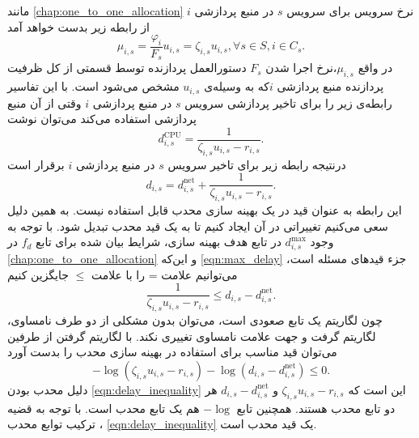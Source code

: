     مانند \cref{chap:one_to_one_allocation} نرخ سرویس برای سرویس $s$ در منبع پردازشی $i$ از رابطه زیر بدست خواهد آمد
    \begin{equation}
      \mu_{i,s} = \frac{\varphi_i}{F_s} u_{i,s} = \zeta_{i,s} u_{i,s}, \forall s \in S, i \in C_s.
    \end{equation}
    در واقع $\mu_{i,s}$،نرخ اجرا شدن $F_s$ دستورالعمل پردازنده توسط قسمتی از کل ظرفیت پردازنده منبع پردازشی $i$که به وسیله‌ی $u_{i,s}$ مشخص می‌شود است.
    با این تفاسیر رابطه‌ی زیر را برای تاخیر پردازشی سرویس $s$ در منبع پردازشی $i$ وقتی از آن منبع پردازشی استفاده می‌کند می‌توان نوشت
    \begin{equation}
      d_{i,s}^\text{CPU} = \frac{1}{\zeta_{i,s} u_{i,s} - r_{i,s}}.
    \end{equation}
    درنتیجه رابطه زیر برای تاخیر سرویس $s$ در منبع پردازشی $i$ برقرار است
    \begin{equation}
      d_{i,s} = d_{i,s}^\text{net} + \frac{1}{\zeta_{i,s} u_{i,s} - r_{i,s}}.
    \end{equation}
    این رابطه به عنوان قید در یک بهینه سازی محدب قابل استفاده نیست.
    به همین دلیل سعی می‌کنیم تغییراتی در آن ایجاد کنیم تا به یک قید محدب تبدیل شود.
    با توجه به وجود $d_{i,s}^\text{max}$ در تابع هدف بهینه سازی، شرایط بیان شده برای تابع $f_d$ در \cref{chap:one_to_one_allocation} و این‌که \cref{eqn:max_delay} جزء قید‌های مسئله است، می‌توانیم علامت = را با علامت $\le$ جایگزین کنیم
    \begin{equation}
      \frac{1}{\zeta_{i,s} u_{i,s} - r_{i,s}} \le d_{i,s} - d_{i,s}^\text{net}.
    \end{equation}
    چون لگاریتم یک تابع صعودی است، می‌توان بدون مشکلی از دو طرف نامساوی، لگاریتم گرفت و جهت علامت نامساوی تغییری نکند.
    با لگاریتم گرفتن از طرفین می‌توان قید مناسب برای استفاده در بهینه سازی محدب را بدست آورد
    \begin{equation}\label{eqn:delay_inequality}
      - \log (\zeta_{i,s} u_{i,s} - r_{i,s}) - \log (d_{i,s} - d_{i,s}^\text{net}) \le 0.
    \end{equation}
    دلیل محدب بودن \cref{eqn:delay_inequality} این است که $\zeta_{i,s} u_{i,s} - r_{i,s}$ و $d_{i,s} - d_{i,s}^\text{net}$ هر دو تابع محدب هستند.
    همچنین تابع $-\log$ هم یک تابع محدب است.
    با توجه به قضیه ترکیب توابع محدب \cite{boyd2004convex}، \cref{eqn:delay_inequality} یک قید محدب است.

